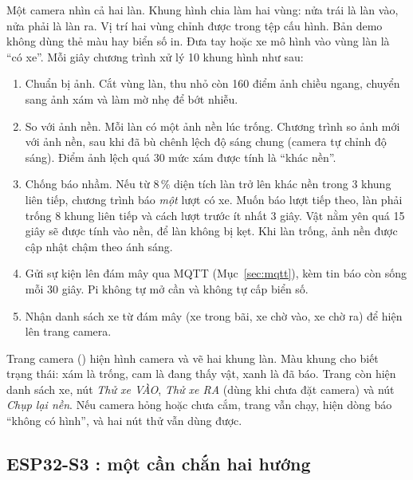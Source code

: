 Một camera nhìn cả hai làn. Khung hình chia làm hai vùng: nửa trái là làn vào, nửa phải là làn ra. Vị trí hai vùng chỉnh được trong tệp cấu hình. Bản demo không dùng thẻ màu hay biển số in. Đưa tay hoặc xe mô hình vào vùng làn là ``có xe''. Mỗi giây chương trình xử lý 10 khung hình như sau:

\begin{enumerate}
  \item Chuẩn bị ảnh. Cắt vùng làn, thu nhỏ còn 160 điểm ảnh chiều ngang, chuyển sang ảnh xám và làm mờ nhẹ để bớt nhiễu.
  \item So với ảnh nền. Mỗi làn có một ảnh nền lúc trống. Chương trình so ảnh mới với ảnh nền, sau khi đã bù chênh lệch độ sáng chung (camera tự chỉnh độ sáng). Điểm ảnh lệch quá 30 mức xám được tính là ``khác nền''.
  \item Chống báo nhầm. Nếu từ 8\,\% diện tích làn trở lên khác nền trong 3 khung liên tiếp, chương trình báo \emph{một} lượt có xe. Muốn báo lượt tiếp theo, làn phải trống 8 khung liên tiếp và cách lượt trước ít nhất 3 giây. Vật nằm yên quá 15 giây sẽ được tính vào nền, để làn không bị kẹt. Khi làn trống, ảnh nền được cập nhật chậm theo ánh sáng.
  \item Gửi sự kiện lên đám mây qua MQTT (Mục~\ref{sec:mqtt}), kèm tin báo còn sống mỗi 30 giây. Pi không tự mở cần và không tự cấp biển số.
  \item Nhận danh sách xe từ đám mây (xe trong bãi, xe chờ vào, xe chờ ra) để hiện lên trang camera.
\end{enumerate}

Trang camera () hiện hình camera và vẽ hai khung làn. Màu khung cho biết trạng thái: xám là trống, cam là đang thấy vật, xanh là đã báo. Trang còn hiện danh sách xe, nút \emph{Thử xe VÀO}, \emph{Thử xe RA} (dùng khi chưa đặt camera) và nút \emph{Chụp lại nền}. Nếu camera hỏng hoặc chưa cắm, trang vẫn chạy, hiện dòng báo ``không có hình'', và hai nút thử vẫn dùng được.


\subsection{ESP32-S3 : một cần chắn hai hướng}

